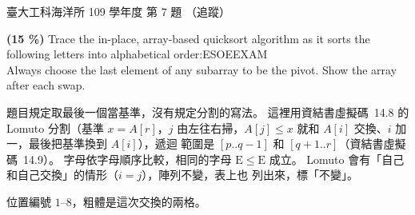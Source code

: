 \begin{pastexam}[label={px:ntu-109-esoe-ds-07}]{臺大工科海洋所 109 學年度 第 7 題}
（追蹤）

\textbf{(15 \%)} Trace the in-place, array-based quicksort algorithm as it sorts the following
letters into alphabetical order:\quad E\quad S\quad O\quad E\quad E\quad X\quad A\quad M\\
Always choose the last element of any subarray to be the pivot. Show the array after each swap.
\end{pastexam}

\begin{pastsoln}
題目規定取最後一個當基準，沒有規定分割的寫法。 這裡用資結書虛擬碼~14.8 的 Lomuto 分割（基準
$x = A[r]$，$j$ 由左往右掃，$A[j] \le x$ 就和 $A[i]$ 交換、$i$ 加一，最後把基準換到 $A[i]$），遞迴
範圍是 $[p..q-1]$ 和 $[q+1..r]$（資結書虛擬碼~14.9）。 字母依字母順序比較，相同的字母
$\mathrm{E} \le \mathrm{E}$ 成立。 Lomuto 會有「自己和自己交換」的情形（$i = j$），陣列不變，表上也
列出來，標「不變」。

位置編號 $1$--$8$，粗體是這次交換的兩格。


\end{pastsoln}
